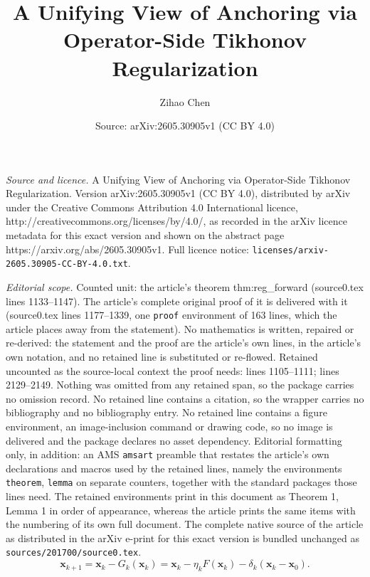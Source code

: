 \documentclass[10pt,a4paper]{amsart}
\title{A Unifying View of Anchoring via Operator-Side Tikhonov Regularization}
\author{Zihao Chen}
\date{Source: arXiv:2605.30905v1 (CC BY 4.0)}
\newcommand{\vect}[1]{\mathbf{#1}}
\begin{document}
\maketitle

\noindent\emph{Source and licence.} A Unifying View of Anchoring via Operator-Side Tikhonov Regularization. Version arXiv:2605.30905v1 (CC BY 4.0), distributed by arXiv under the Creative Commons Attribution 4.0 International licence, http://creativecommons.org/licenses/by/4.0/, as recorded in the arXiv licence metadata for this exact version and shown on the abstract page https://arxiv.org/abs/2605.30905v1. Full licence notice: \texttt{licenses/arxiv-2605.30905-CC-BY-4.0.txt}.\par\smallskip

\noindent\textit{Editorial scope.} Counted unit: the article's theorem thm:reg\_forward (source0.tex lines 1133--1147). The article's complete original proof of it is delivered with it (source0.tex lines 1177--1339, one \texttt{proof} environment of 163 lines, which the article places away from the statement). No mathematics is written, repaired or re-derived: the statement and the proof are the article's own lines, in the article's own notation, and no retained line is substituted or re-flowed.  Retained uncounted as the source-local context the proof needs: lines 1105--1111; lines 2129--2149.  Nothing was omitted from any retained span, so the package carries no omission record.  No retained line contains a citation, so the wrapper carries no bibliography and no bibliography entry.  No retained line contains a figure environment, an image-inclusion command or drawing code, so no image is delivered and the package declares no asset dependency.  Editorial formatting only, in addition: an AMS \texttt{amsart} preamble that restates the article's own declarations and macros used by the retained lines, namely the environments \texttt{theorem}, \texttt{lemma} on separate counters, together with the standard packages those lines need.  The retained environments print in this document as Theorem 1, Lemma 1 in order of appearance, whereas the article prints the same items with the numbering of its own full document.  The complete native source of the article as distributed in the arXiv e-print for this exact version is bundled unchanged as \texttt{sources/201700/source0.tex}.
\begin{equation}\label{eq:reg_forward_step}
    \vect{x}_{k+1}
    =
    \vect{x}_k-G_k(\vect{x}_k)
    =
    \vect{x}_k-\eta_kF(\vect{x}_k)-\delta_k(\vect{x}_k-\vect{x}_0).
\end{equation}
\end{document}
